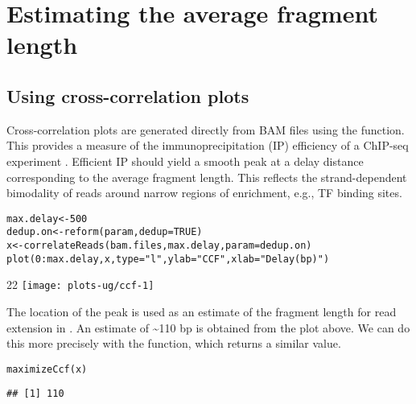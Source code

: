 \documentclass{report}\usepackage[]{graphicx}\usepackage[usenames,dvipsnames]{color}
\makeatletter
\def\maxwidth{ %
  \ifdim\Gin@nat@width>\linewidth
    \linewidth
  \else
    \Gin@nat@width
  \fi
}
\newcommand{\hlnum}[1]{\textcolor[rgb]{0.816,0.125,0.439}{#1}}%
\newcommand{\hlstr}[1]{\textcolor[rgb]{0.251,0.627,0.251}{#1}}%
\newcommand{\hlopt}[1]{\textcolor[rgb]{0,0,0}{#1}}%
\newcommand{\hlstd}[1]{\textcolor[rgb]{0.251,0.251,0.251}{#1}}%
\newcommand{\hlkwb}[1]{\textcolor[rgb]{0,0,0}{#1}}%
\newcommand{\hlkwc}[1]{\textcolor[rgb]{0.251,0.251,0.251}{#1}}%
\newcommand{\hlkwd}[1]{\textcolor[rgb]{0.878,0.439,0.125}{#1}}%
\newenvironment{knitrout}{}{} %
\makeatother
\begin{document}
\section{Estimating the average fragment length}
\label{sec:ccf}

\subsection{Using cross-correlation plots}
Cross-correlation plots are generated directly from BAM files using the  function. 
This provides a measure of the immunoprecipitation (IP) efficiency of a ChIP-seq experiment \cite{kharchenko2008}. 
Efficient IP should yield a smooth peak at a delay distance corresponding to the average fragment length. 
This reflects the strand-dependent bimodality of reads around narrow regions of enrichment, e.g., TF binding sites. 

\begin{knitrout}
\color{fgcolor}\begin{kframe}
\begin{alltt}
\hlstd{max.delay} \hlkwb{<-} \hlnum{500}
\hlstd{dedup.on} \hlkwb{<-} \hlkwd{reform}\hlstd{(param,} \hlkwc{dedup}\hlstd{=}\hlnum{TRUE}\hlstd{)}
\hlstd{x} \hlkwb{<-} \hlkwd{correlateReads}\hlstd{(bam.files, max.delay,} \hlkwc{param}\hlstd{=dedup.on)}
\hlkwd{plot}\hlstd{(}\hlnum{0}\hlopt{:}\hlstd{max.delay, x,} \hlkwc{type}\hlstd{=}\hlstr{"l"}\hlstd{,} \hlkwc{ylab}\hlstd{=}\hlstr{"CCF"}\hlstd{,} \hlkwc{xlab}\hlstd{=}\hlstr{"Delay (bp)"}\hlstd{)}
\end{alltt}
\end{kframe}\begin{adjustwidth}{2\fltoffset}{2\fltoffset}
\texttt{[image: plots-ug/ccf-1]} \end{adjustwidth}
\end{knitrout}

The location of the peak is used as an estimate of the fragment length for read extension in . 
An estimate of \textasciitilde{}110 bp is obtained from the plot above.
We can do this more precisely with the  function, which returns a similar value.

\begin{knitrout}
\color{fgcolor}\begin{kframe}
\begin{alltt}
\hlkwd{maximizeCcf}\hlstd{(x)}
\end{alltt}
\begin{verbatim}
## [1] 110
\end{verbatim}
\end{kframe}
\end{knitrout}
\end{document}
